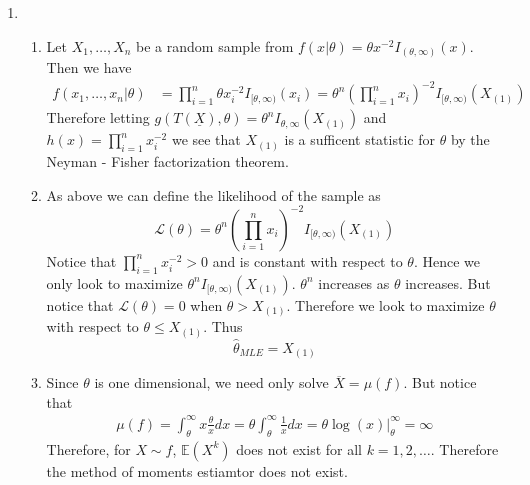 \documentclass[12pt]{article}  %
\newcommand{\E}{{\mathbb{E}}}
\begin{document}
\begin{enumerate}
\item 
\begin{enumerate}
\item Let $X_1, \ldots, X_n$ be a random sample from $f(x|\theta) = \theta x^{-2}I_{(\theta, \infty)}(x)$. Then we have 
\begin{align*}
f(x_1, \ldots, x_n|\theta) &= \prod_{i=1}^{n} \theta x_i^{-2}I_{[\theta, \infty)}(x_i)= \theta^n\left(\prod_{i=1}^{n}x_i\right)^{-2}I_{[\theta, \infty)}(X_{(1)})
\end{align*}
Therefore letting $g(T(\underline{X}), \theta) = \theta^{n}I_{\theta, \infty}(X_{(1)})$ and $h(x) = \prod_{i=1}^{n}x_i^{-2}$ we see that $X_{(1)}$ is a sufficent statistic for $\theta$ by the Neyman - Fisher factorization theorem. 

\item As above we can define the likelihood of the sample as $$\mathcal{L}(\theta) = \theta^n\left(\prod_{i=1}^{n}x_i\right)^{-2}I_{[\theta, \infty)}(X_{(1)})$$ Notice that $\prod_{i=1}^{n}x_i^{-2}>0$ and is constant with respect to $\theta$. Hence we only look to maximize $\theta^nI_{[\theta, \infty)}(X_{(1)})$. $\theta^n$ increases as $\theta$ increases. But notice that $\mathcal{L}(\theta) = 0$ when $\theta>X_{(1)}$. Therefore we look to maximize $\theta$ with respect to $\theta \leq X_{(1)}$. Thus $$\hat{\theta}_{MLE} = X_{(1)}$$

\item Since $\theta$ is one dimensional, we need only solve $\overline{X} = \mu(f)$. But notice that
\begin{align*}
\mu(f) = \int_{\theta}^{\infty}x\frac{\theta}{x}dx = \theta\int_{\theta}^{\infty}\frac{1}{x}dx = \theta\log(x)\Big\vert_{\theta}^{\infty} = \infty
\end{align*}
Therefore, for $X\sim f$, $\E(X^k)$ does not exist for all $k = 1,2, \ldots$. Therefore the method of moments estiamtor does not exist.
\end{enumerate}


\end{enumerate}
\end{document}
